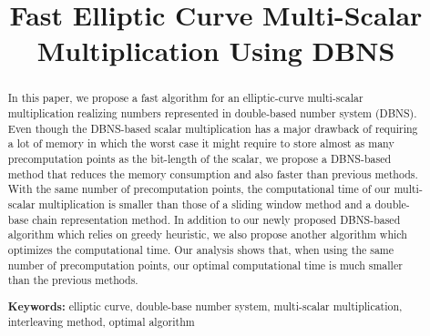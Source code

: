 \documentclass[a4paper,11pt,runningheads]{llncs}
\newif\ifpublic
\begin{document}
\title{Fast Elliptic Curve Multi-Scalar Multiplication Using DBNS} %

\ifpublic
\authorrunning{C. Chuengsatiansup, V. Suppakitpaisarn}
\author{
Chitchanok Chuengsatiansup\inst{1}\thanks{This work was supported by the Netherlands Organisation for Scientific Research (NWO) under grant 639.073.005.}
\and
Vorapong Suppakitpaisarn\inst{2,3}
}

\institute{
Department of Mathematics and Computer Science \\
Technische Universiteit Eindhoven\\
P.O. Box 513, 5600 MB Eindhoven, the Netherlands\\
\email{c.chuengsatiansup@tue.nl}
\and
NII; JST ERATO Kawarabayashi Large Graph Project\\
2-1-2 Hitotsubashi, Chiyoda-ku, Tokyo, 101-8430, Japan\\
\and
Department of Computer Science, The University of Tokyo\\
7-3-1 Hongo, Bunkyo-ku, Tokyo, 113-0033, Japan\\
\email{vorapong@lager.is.s.u-tokyo.ac.jp}
}

\fi
\maketitle

\begin{abstract}
In this paper, we propose a fast algorithm for an elliptic-curve multi-scalar multiplication realizing numbers represented in double-based number system (DBNS).
Even though the DBNS-based scalar multiplication has a major drawback of requiring a lot of memory
in which the worst case it might require to store almost as many precomputation points as the bit-length of the scalar,
we propose a DBNS-based method that reduces the memory consumption and also faster than previous methods.
With the same number of precomputation points, the computational time of our multi-scalar multiplication is smaller than
those of a sliding window method and a double-base chain representation method.
In addition to our newly proposed DBNS-based algorithm which relies on greedy heuristic,
we also propose another algorithm which optimizes the computational time.
Our analysis shows that, when using the same number of precomputation points, our optimal computational time is much smaller than the previous methods.

\smallskip
\textbf{Keywords:} 
elliptic curve, double-base number system, multi-scalar multiplication, interleaving method, optimal algorithm
\end{abstract}






\clearpage


\end{document}
